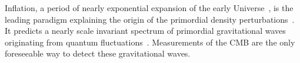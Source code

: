\documentclass[PICOReport.tex]{subfiles}
\begin{document}


Inflation, a period of nearly exponential expansion of the early Universe~\cite{Guth:1980zm,Linde:1981mu,Albrecht:1982wi,Starobinsky:1980te}, is the leading paradigm explaining the origin of the primordial density perturbations~\cite{Mukhanov:1981xt,Guth:1982ec,Hawking:1982cz,Starobinsky:1982ee,Bardeen:1983qw}. It predicts a nearly scale invariant spectrum of primordial gravitational waves originating from quantum fluctuations~\cite{Starobinsky:1979ty}. 
Measurements of the \ac{CMB} are the only foreseeable way to detect these gravitational waves.

\end{document}
